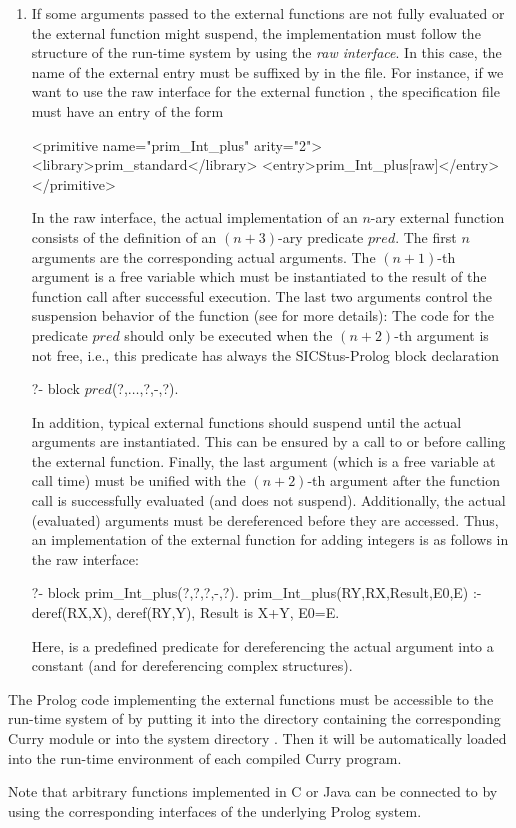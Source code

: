 \begin{enumerate}
\item
If some arguments passed to the external functions are not fully evaluated
or the external function might suspend, the implementation must follow
the structure of the \CYS run-time system by using
the \emph{raw interface}. In this case, the name of the external entry
must be suffixed by \ccode{[raw]} in the  file.
For instance, if we want to use the raw interface for the external function
,
the specification file  must have an entry of the form
\begin{curry}
<primitive name="prim_Int_plus" arity="2">
  <library>prim_standard</library>
  <entry>prim_Int_plus[raw]</entry>
</primitive>
\end{curry}
In the raw interface, the actual implementation of an $n$-ary external function consists
of the definition of an $(n+3)$-ary predicate $pred$.
The first $n$ arguments are the corresponding actual arguments.
The $(n+1)$-th argument is a free variable which must be
instantiated to the result of the function call after
successful execution. The last two arguments
control the suspension behavior of the function
(see \cite{AntoyHanus00FROCOS} for more details):
The code for the predicate $pred$
should only be executed when the $(n+2)$-th argument
is not free, i.e., this predicate has always the
SICStus-Prolog block declaration
\begin{curry}
?- block $pred$(?,$\ldots$,?,-,?).
\end{curry}
In addition, typical external functions should suspend
until the actual arguments are instantiated. This can be ensured
by a call to  or \code{(\$\#)}
before calling the external function. Finally, the
last argument (which is a free variable at call time)
must be unified with the $(n+2)$-th argument
after the function call is successfully evaluated
(and does not suspend). Additionally, the actual (evaluated) arguments
must be dereferenced before they are accessed.
Thus, an implementation
of the external function for adding integers is as follows in the raw interface:
\begin{curry}
?- block prim_Int_plus(?,?,?,-,?).
prim_Int_plus(RY,RX,Result,E0,E) :-
     deref(RX,X), deref(RY,Y), Result is X+Y, E0=E.
\end{curry}
Here,  is a predefined predicate for dereferencing the
actual argument into a constant (and  for dereferencing
complex structures).
\end{enumerate}
%
The Prolog code implementing the external functions must be accessible to the run-time
system of \CYS by putting it into the directory containing the corresponding
Curry module or into the system directory
.
Then it will be automatically loaded into the run-time environment
of each compiled Curry program.

Note that arbitrary functions implemented in C or Java can be connected to
\CYS by using the corresponding interfaces of the underlying Prolog system.



